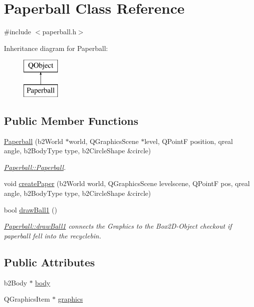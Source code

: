 \hypertarget{class_paperball}{}\section{Paperball Class Reference}
\label{class_paperball}


{\ttfamily \#include $<$paperball.\+h$>$}

Inheritance diagram for Paperball\+:\begin{figure}[H]
\begin{center}
\leavevmode
\includegraphics[height=2.000000cm]{class_paperball}
\end{center}
\end{figure}
\subsection*{Public Member Functions}
\begin{DoxyCompactItemize}
\item 
\hyperlink{class_paperball_ad0d9d4562bd894e529fdfa7a3ecb8e96}{Paperball} (b2\+World $\ast$world, Q\+Graphics\+Scene $\ast$level, Q\+PointF position, qreal angle, b2\+Body\+Type type, b2\+Circle\+Shape \&circle)
\begin{DoxyCompactList}\small\item\em \hyperlink{class_paperball_ad0d9d4562bd894e529fdfa7a3ecb8e96}{Paperball\+::\+Paperball}. \end{DoxyCompactList}\item 
void \hyperlink{class_paperball_a1d3b557c34068db1c78816c9147fe680}{create\+Paper} (b2\+World world, Q\+Graphics\+Scene levelscene, Q\+PointF pos, qreal angle, b2\+Body\+Type type, b2\+Circle\+Shape \&circle)
\item 
bool \hyperlink{class_paperball_a3bb15d3327d35c3408fe7e5b06bce078}{draw\+Ball1} ()
\begin{DoxyCompactList}\small\item\em \hyperlink{class_paperball_a3bb15d3327d35c3408fe7e5b06bce078}{Paperball\+::draw\+Ball1} connects the Graphics to the Box2\+D-\/\+Object checkout if paperball fell into the recyclebin. \end{DoxyCompactList}\end{DoxyCompactItemize}
\subsection*{Public Attributes}
\begin{DoxyCompactItemize}
\item 
b2\+Body $\ast$ \hyperlink{class_paperball_a5d5b3e0d4237ba80fe9590f49c88a0c0}{body}
\item 
Q\+Graphics\+Item $\ast$ \hyperlink{class_paperball_a87b4515e298699c840f541ee637215dd}{graphics}
\end{DoxyCompactItemize}


